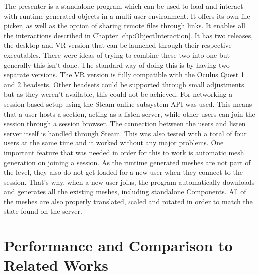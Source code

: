 The presenter is a standalone program which can be used to load and interact with runtime generated objects in a multi-user environment. It offers its own file picker, as well as the option of sharing remote files through links. It enables all the interactions described in Chapter \ref{chp:ObjectInteraction}. It has two releases, the desktop and VR version that can be launched through their respective executables. There were ideas of trying to combine these two into one but generally this isn't done. The standard way of doing this is by having two separate versions. The VR version is fully compatible with the Oculus Quest 1 and 2 headsets. Other headsets could be supported through small adjustments but as they weren't available, this could not be achieved. For networking a session-based setup using the Steam online subsystem API was used. This means that a user hosts a section, acting as a listen server, while other users can join the session through a session browser. The connection between the users and listen server itself is handled through Steam. This was also tested with a total of four users at the same time and it worked without any major problems. One important feature that was needed in order for this to work is automatic mesh generation on joining a session. As the runtime generated meshes are not part of the level, they also do not get loaded for a new user when they connect to the session. That's why, when a new user joins, the program automatically downloads and generates all the existing meshes, including standalone Components. All of the meshes are also properly translated, scaled and rotated in order to match the state found on the server. 

\section{Performance and Comparison to Related Works}

